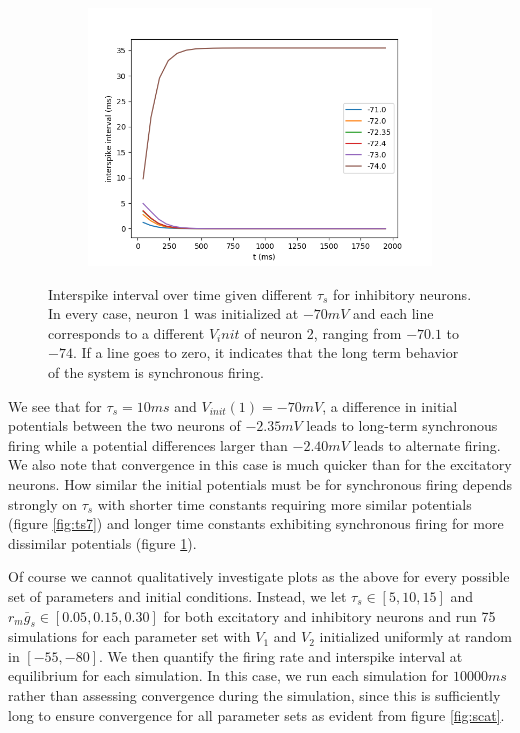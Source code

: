 \documentclass{article}
\begin{document}
\begin{figure}[h]
	\begin{subfigure}[t]{0.30\linewidth}
		\centering
		\includegraphics[width = 1.0\linewidth, trim={20 10 20 20}, clip=true]{intervals_ts_13i.png}
		\label{fig:ts13}	
	\end{subfigure}%
\label{fig:intsi}
\caption{Interspike interval over time given different $\tau_s$ for inhibitory neurons. In every case, neuron 1 was initialized at $-70 mV$ and each line corresponds to a different $V_init$ of neuron 2, ranging from $-70.1$ to $-74$. If a line goes to zero, it indicates that the long term behavior of the system is synchronous firing.}
\end{figure}

We see that for $\tau_s=10ms$ and $V_{init}(1)=-70 mV$, a difference in initial potentials between the two neurons of $-2.35 mV$ leads to long-term synchronous firing while a potential differences larger than $-2.40mV$ leads to alternate firing. We also note that convergence in this case is much quicker than for the excitatory neurons.
How similar the initial potentials must be for synchronous firing depends strongly on $\tau_s$ with shorter time constants requiring more similar potentials (figure \ref{fig:ts7}) and longer time constants exhibiting synchronous firing for more dissimilar potentials (figure \ref{fig:ts13}).

Of course we cannot qualitatively investigate plots as the above for every possible set of parameters and initial conditions. Instead, we let $\tau_s \in [5, 10, 15]$ and $r_m \bar g_s \in [0.05, 0.15, 0.30]$ for both excitatory and inhibitory neurons and run 75 simulations for each parameter set with $V_1$ and $V_2$ initialized uniformly at random in $[-55, -80]$.
We then quantify the firing rate and interspike interval at equilibrium for each simulation.
In this case, we run each simulation for $10000 ms$ rather than assessing convergence during the simulation, since this is sufficiently long to ensure convergence for all parameter sets as evident from figure \ref{fig:scat}.
\end{document}
